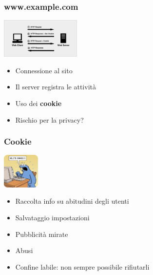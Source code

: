 \documentclass[xcolor=svgnames,handout]{beamer}
\begin{document}
\begin{frame}
	\frametitle{www.example.com}

	\begin{block}{\includegraphics[width=150px]{img/request-response.png}}
			\begin{itemize}
						\pause
					\item Connessione al sito
						\pause
					\item Il server registra le attività
						\pause
					\item Uso dei {\bf cookie}
						\pause
					\item Rischio per la privacy?
			\end{itemize}
	\end{block}
\end{frame}

\begin{frame}
	\frametitle{Cookie}

	\begin{block}{\includegraphics[width=70px]{img/cookie.jpg}}
			\begin{itemize}
						\pause
					\item Raccolta info su abitudini degli utenti
						\pause
					\item Salvataggio impostazioni
						\pause
					\item Pubblicità mirate
						\pause
					\item Abusi
						\pause
					\item Confine labile: non sempre possibile rifiutarli
			\end{itemize}
	\end{block}
\end{frame}
\end{document}
